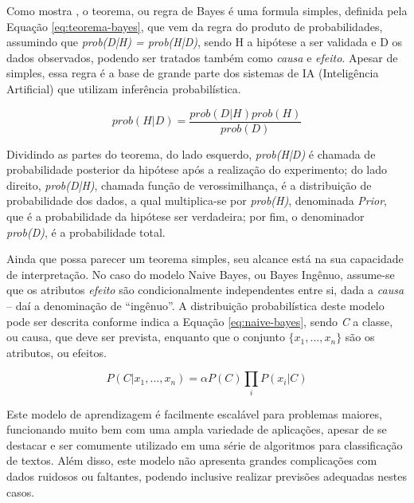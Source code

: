 \documentclass[oneside,openright,12pt]{ufsm_2015} %
\begin{document}
    \par Como mostra \cite{book:russell:10}, o teorema, ou regra de Bayes é uma formula simples, definida pela Equação \ref{eq:teorema-bayes}, que vem da regra do produto de probabilidades, assumindo que \textit{prob(D|H) = prob(H|D)}, sendo H a hipótese a ser validada e D os dados observados, podendo ser tratados também como \textit{causa} e \textit{efeito}. Apesar de simples, essa regra é a base de grande parte dos sistemas de IA (Inteligência Artificial) que utilizam inferência probabilística.
    
    \begin{equation} \label{eq:teorema-bayes}
    prob(H|D) = \frac{prob(D|H)prob(H)}{prob(D)}
    \end{equation}
    
    \par Dividindo as partes do teorema, do lado esquerdo, \textit{prob(H|D)} é chamada de probabilidade posterior da hipótese após a realização do experimento; do lado direito, \textit{prob(D|H)}, chamada função de verossimilhança, é a distribuição de probabilidade dos dados, a qual multiplica-se por \textit{prob(H)}, denominada \textit{Prior}, que é a probabilidade da hipótese ser verdadeira; por fim, o denominador \textit{prob(D)}, é a probabilidade total.
    
    \par Ainda que possa parecer um teorema simples, seu alcance está na sua capacidade de interpretação. No caso do modelo Naive Bayes, ou Bayes Ingênuo, assume-se que os atributos \textit{efeito} são condicionalmente independentes entre si, dada a \textit{causa} -- daí a denominação de ``ingênuo''. A distribuição probabilística deste modelo pode ser descrita conforme indica a Equação \ref{eq:naive-bayes}, sendo \textit{C} a classe, ou causa, que deve ser prevista, enquanto que o conjunto $\{x_1, ..., x_n\}$ são os atributos, ou efeitos.
    
    \begin{equation} \label{eq:naive-bayes}
    P(C | x_1, ..., x_n) = \alpha P(C)\prod_i{P(x_i | C)}
    \end{equation}
    
    \par Este modelo de aprendizagem é facilmente escalável para problemas maiores, funcionando muito bem com uma ampla variedade de aplicações, apesar de se destacar e ser comumente utilizado em uma série de algoritmos para classificação de textos. Além disso, este modelo não apresenta grandes complicações com dados ruidosos ou faltantes, podendo inclusive realizar previsões adequadas nestes casos. %
    
\end{document}
